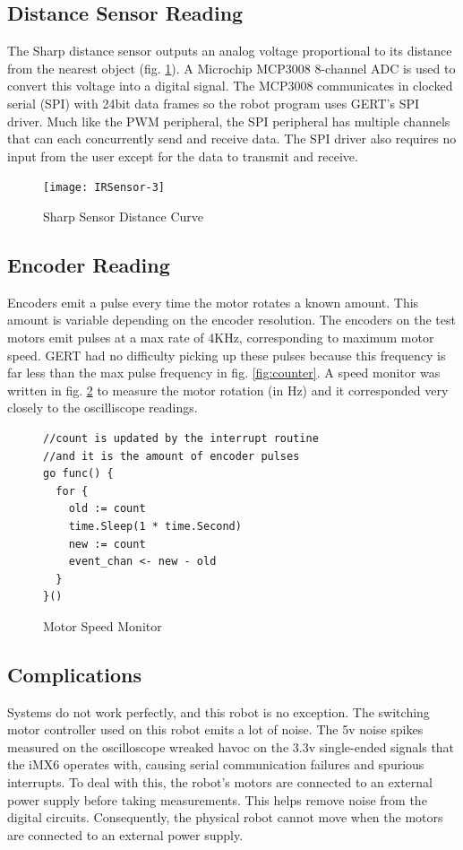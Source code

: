 \subsection{Distance Sensor Reading}
The Sharp distance sensor outputs an analog voltage proportional to its distance from the nearest object (fig. \ref{fig:curve}).
A Microchip MCP3008 8-channel ADC is used to convert this voltage into a digital signal. The MCP3008 communicates in clocked
serial (SPI) with 24bit data frames so the robot program uses GERT's SPI driver. Much like the
PWM peripheral, the SPI peripheral has multiple channels that can each concurrently send and receive data. The SPI
driver also requires no input from the user except for the data to transmit and receive.

\begin{figure}[h]
\begin{center}
  \texttt{[image: IRSensor-3]}
\end{center}
  \caption{Sharp Sensor Distance Curve} \label{fig:curve}
\end{figure}

\clearpage
\subsection{Encoder Reading}
Encoders emit a pulse every time the motor rotates a known amount. This amount is variable depending on the
encoder resolution. The encoders on the test motors emit pulses at a max rate of 4KHz, corresponding to
maximum motor speed. GERT had no difficulty picking up these pulses because this frequency is far less than
the max pulse frequency in fig. \ref{fig:counter}. A speed monitor was written in fig. \ref{fig:speedmon}
to measure the motor rotation (in Hz) and it corresponded very closely to the oscilliscope readings.

\begin{figure}[h]
\begin{center}
\begin{lstlisting}
//count is updated by the interrupt routine
//and it is the amount of encoder pulses
go func() {
  for {
    old := count
    time.Sleep(1 * time.Second)
    new := count
    event_chan <- new - old
  }
}()
\end{lstlisting}
\end{center}
  \caption{Motor Speed Monitor} \label{fig:speedmon}
\end{figure}

\subsection{Complications}
Systems do not work perfectly, and this robot is no exception. The switching motor controller used
on this robot emits a lot of noise. The 5v noise spikes measured on the oscilloscope wreaked havoc
on the 3.3v single-ended signals that the iMX6 operates with, causing serial communication failures
and spurious interrupts. To deal with this, the robot's motors are connected to an external power supply before
taking measurements. This helps remove noise from the digital circuits. Consequently, the physical
robot cannot move when the motors are connected to an external power supply.

